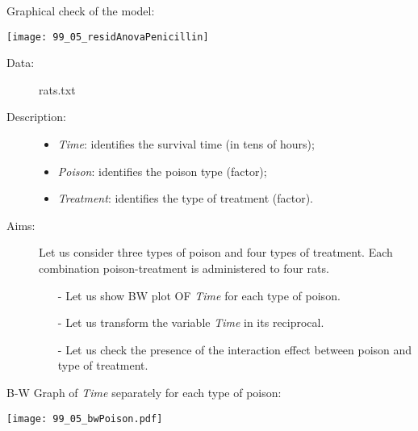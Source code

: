 \begin{frame}
   Graphical check of the model:\\
  \vspace{.1cm}
  \begin{center}
    \texttt{[image: 99\_05\_residAnovaPenicillin]}
    \end{center}
\end{frame}



\begin{frame}
  \begin{description}
    \item[Data: ]rats.txt \\ 
    \item[Description: ]
      \begin{footnotesize}
        \begin{itemize}
          \item \textit{Time}: identifies the survival time (in tens of hours);
          \item \textit{Poison}: identifies the poison type (factor);
          \item \textit{Treatment}: identifies the type of treatment (factor).
        \end{itemize}
      \end{footnotesize}
    \item[Aims: ]
      \begin{footnotesize}
        Let us consider three types of poison and four types of treatment. Each combination poison-treatment is administered to four rats. 
        \begin{itemize}
          \item[-] Let us show BW plot OF \textit{Time} for each type of poison.
          \item[-] Let us transform the variable \textit{Time} in its reciprocal.
          \item[-] Let us check the presence of the interaction effect between poison and type of treatment.
        \end{itemize}
      \end{footnotesize}
  \end{description}
\end{frame}

\begin{frame}
  B-W Graph of \textit{Time} separately for each type of poison:\\
  \vspace{-0.5cm}
  \begin{center}
    \texttt{[image: 99\_05\_bwPoison.pdf]}
  \end{center}
\end{frame}

